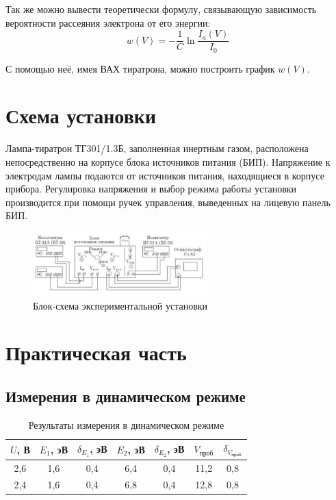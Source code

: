 \documentclass[a4paper, 12pt]{article}
\begin{document}
Так же можно вывести теоретически формулу, связывающую зависимость вероятности рассеяния электрона от его энергии:
\begin{equation}
w(V) = -\frac{1}{C} \ln \frac{I_a(V)}{I_0}
\end{equation}

С помощью неё, имея ВАХ тиратрона, можно построить график $w(V)$.

\section*{Схема установки}
Лампа-тиратрон ТГ301/1.3Б, заполненная инертным газом, расположена непосредственно на корпусе блока источников питания (БИП). Напряжение к электродам лампы подаются от источников питания, находящиеся в корпусе прибора. Регулировка напряжения и выбор режима работы установки производится при помощи ручек управления, выведенных на лицевую панель БИП.

\begin{figure}[h]
\begin{center}
\includegraphics[width = 0.6\textwidth]{1}
\caption{Блок-схема экспериментальной установки}
\end{center}
\end{figure}

\newpage

\section{Практическая часть}
\subsection{Измерения в динамическом режиме}

\begin{table}[h!]
\begin{center}
\caption{Результаты измерения в динамическом режиме}
\begin{tabular}{|c|c|c|c|c|c|c|}
\hline
$U$, В & $E_1$, эВ & $\delta_{E_1}$, эВ & $E_2$, эВ & $\delta_{E_2}$, эВ & $V_{\text{}проб}$ & $\delta_{V_{\text{проб}}}$ \\ \hline
2,6    & 1,6       & 0,4                & 6,4       & 0,4                & 11,2              & 0,8                        \\ \hline
2,4    & 1,6       & 0,4                & 6,8       & 0,4                & 12,8              & 0,8                        \\ \hline
\end{tabular}
\end{center}
\end{table}
\end{document}

